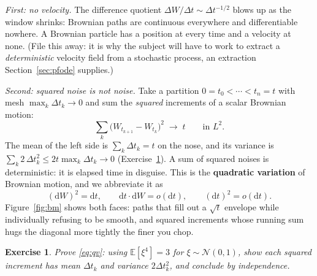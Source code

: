 \documentclass[10pt,a4paper]{article}
\newtheorem{exercise}{Exercise}
\newcommand{\E}{\mathbb{E}}
\newcommand{\dd}{\mathrm{d}}
\begin{document}
\emph{First: no velocity.} The difference quotient
$\Delta W / \Delta t \sim \Delta t^{-1/2}$ blows up as the window
shrinks: Brownian paths are continuous everywhere and differentiable
nowhere. A Brownian particle has a position at every time and a velocity
at none. (File this away: it is why the subject will have to work to
extract a \emph{deterministic} velocity field from a stochastic process,
an extraction Section~\ref{sec:pfode} supplies.)

\emph{Second: squared noise is not noise.} Take a partition
$0 = t_0 < \cdots < t_n = t$ with mesh $\max_k \Delta t_k \to 0$ and sum
the \emph{squared} increments of a scalar Brownian motion:
\begin{equation}
\sum_{k} \big( W_{t_{k+1}} - W_{t_k} \big)^2 \;\longrightarrow\; t
\qquad \text{in } L^2.
\label{eq:qv}
\end{equation}
The mean of the left side is $\sum_k \Delta t_k = t$ on the nose, and
its variance is $\sum_k 2\,\Delta t_k^2 \le 2t \max_k \Delta t_k \to 0$
(Exercise~\ref{ex:qv}). A sum of squared noises is deterministic: it is
elapsed time in disguise. This is the \textbf{quadratic variation} of
Brownian motion, and we abbreviate it as
\begin{equation}
(\dd W)^2 = \dd t, \qquad \dd t \cdot \dd W = o(\dd t), \qquad
(\dd t)^2 = o(\dd t).
\label{eq:dw2}
\end{equation}
Figure~\ref{fig:bm} shows both faces: paths that fill out a
$\sqrt{t}$ envelope while individually refusing to be smooth, and squared
increments whose running sum hugs the diagonal more tightly the finer
you chop.

\begin{exercise}
\label{ex:qv}
Prove \eqref{eq:qv}: using $\E[\xi^4] = 3$ for $\xi \sim \mathcal{N}(0,1)$,
show each squared increment has mean $\Delta t_k$ and variance
$2\Delta t_k^2$, and conclude by independence.
\end{exercise}
\end{document}
